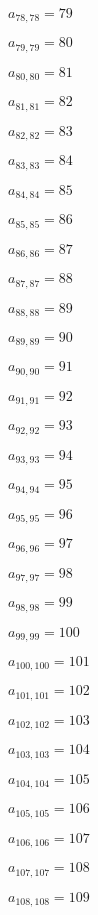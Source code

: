 \documentclass[a4paper,12pt]{article}
\begin{document}
$a _{ 78, 78 } = 79$

$a _{ 79, 79 } = 80$

$a _{ 80, 80 } = 81$

$a _{ 81, 81 } = 82$

$a _{ 82, 82 } = 83$

$a _{ 83, 83 } = 84$

$a _{ 84, 84 } = 85$

$a _{ 85, 85 } = 86$

$a _{ 86, 86 } = 87$

$a _{ 87, 87 } = 88$

$a _{ 88, 88 } = 89$

$a _{ 89, 89 } = 90$

$a _{ 90, 90 } = 91$

$a _{ 91, 91 } = 92$

$a _{ 92, 92 } = 93$

$a _{ 93, 93 } = 94$

$a _{ 94, 94 } = 95$

$a _{ 95, 95 } = 96$

$a _{ 96, 96 } = 97$

$a _{ 97, 97 } = 98$

$a _{ 98, 98 } = 99$

$a _{ 99, 99 } = 100$

$a _{ 100, 100 } = 101$

$a _{ 101, 101 } = 102$

$a _{ 102, 102 } = 103$

$a _{ 103, 103 } = 104$

$a _{ 104, 104 } = 105$

$a _{ 105, 105 } = 106$

$a _{ 106, 106 } = 107$

$a _{ 107, 107 } = 108$

$a _{ 108, 108 } = 109$
\end{document}
